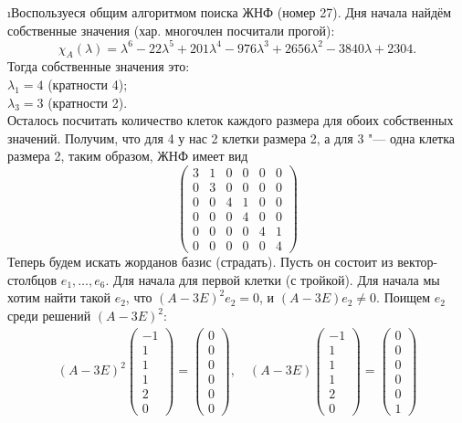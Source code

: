 \i Воспользуеся общим алгоритмом поиска ЖНФ (номер 27). Дня начала найдём собственные значения (хар. многочлен посчитали прогой):
$$\chi_A(\lambda) = \lambda^6 -22\lambda^5 + 201\lambda^4 - 976\lambda^3 + 2656\lambda^2 -3840\lambda + 2304.$$
Тогда собственные значения это:\\
$\lambda_1 = 4$ (кратности 4);\\
$\lambda_3 = 3$ (кратности 2).\\
Осталось посчитать количество клеток каждого размера для обоих собственных значений. Получим, что для 4 у нас 2 клетки размера 2, а для 3 "--- одна клетка размера 2, таким образом, ЖНФ имеет вид
$$\begin{pmatrix}
    3 & 1 & 0 & 0 & 0 & 0\\
    0 & 3 & 0 & 0 & 0 & 0\\
    0 & 0 & 4 & 1 & 0 & 0\\
    0 & 0 & 0 & 4 & 0 & 0\\
    0 & 0 & 0 & 0 & 4 & 1\\
    0 & 0 & 0 & 0 & 0 & 4
\end{pmatrix}$$
Теперь будем искать жорданов базис (страдать). Пусть он состоит из вектор-столбцов $e_1, \ldots, e_6$. Для начала для первой клетки (с тройкой). Для начала мы хотим найти такой $e_2$, что $(A - 3E)^2e_2 = 0$, и $(A - 3E)e_2 \ne 0$. Поищем $e_2$ среди решений $(A - 3E)^2$:
\begin{gather*}
    (A - 3E)^2\begin{pmatrix}
        -1\\1\\1\\1\\2\\0
    \end{pmatrix} = \begin{pmatrix}
        0\\0\\0\\0\\0\\0
    \end{pmatrix},\quad
    (A - 3E)\begin{pmatrix}
        -1\\1\\1\\1\\2\\0
    \end{pmatrix} = \begin{pmatrix}
        0\\0\\0\\0\\0\\1
    \end{pmatrix}\\
\end{gather*}
